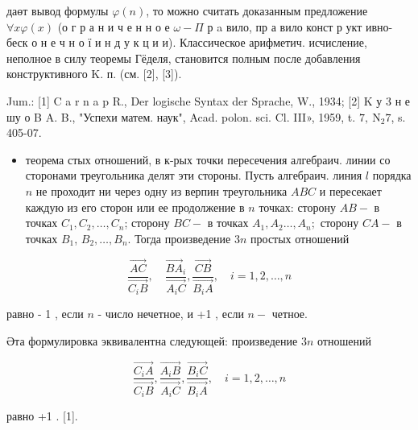 \documentclass[10pt]{article}
\begin{document}
даөт вывод формулы $\varphi(n)$, то можно считать доказанным предложение $\forall x \varphi(x)$ (о г р а н и ч е н н о е $\omega-\Pi$ р a вило, пр а вило конст р укт ивно-беск о н е ч н о ї и н д у к ц и и). Классическое арифметич. исчисление, неполное в силу теоремы Гёделя, становится полным после добавления конструктивного K. п. (см. [2], [3]).



Jum.: [1] C a r n a p R., Der logische Syntax der Sprache, W., 1934; [2] K у 3 н е шу о B A. B., "Успехи матем. наук", Acad. polon. sci. Cl. III», 1959, t. $7, \mathrm{~N}_{2} 7$, s. 405-07.



\begin{itemize}

  \item теорема стых отношений, в к-рых точки пересечения алгебраич. линии со сторонами треугольника делят эти стороны. Пусть алгебраич. линия $l$ порядка $n$ не проходит ни через одну из верпин треугольника $A B C$ и пересекает каждую из его сторон или ее продолжение в $n$ точках: сторону $A B-$ в точках $C_{1}, C_{2}, \ldots, C_{n}$; сторону $B C-$ в точках $A_{1}, A_{2} \ldots, A_{n} ;$ сторону $C A-$ в точках $B_{1}$, $B_{2}, \ldots, B_{n}$. Тогда произведение $3 n$ простых отношений

\end{itemize}



\[

\frac{\overrightarrow{A C}}{\overrightarrow{C_{i} B}}, \quad \frac{\overrightarrow{B A}_{i}}{\overrightarrow{A_{i} C}}, \frac{\overrightarrow{C B}}{\overrightarrow{B_{i} A}}, \quad i=1,2, \ldots, n

\]



равно - 1 , если $n$ - число нечетное, и +1 , если $n-$ четное.



Әта формулировка эквивалентна следующей: произведение $3 n$ отношений



\[

\frac{\overrightarrow{C_{i} A}}{\overrightarrow{C_{i} B}}, \frac{\overrightarrow{A_{i} B}}{\overrightarrow{A_{i} C}}, \frac{\overrightarrow{B_{i} C}}{\overrightarrow{B_{i} A}}, \quad i=1,2, \ldots, n

\]



равно +1 . [1].
\end{document}

